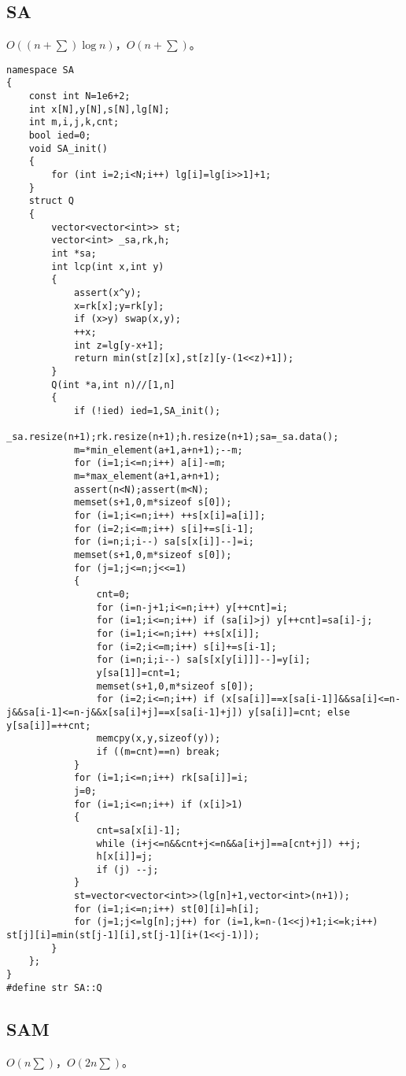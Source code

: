 \documentclass[12pt]{ctexart}
\begin{document}
\subsection{SA}

$O((n+\sum)\log n)$，$O(n+\sum)$。

\begin{lstlisting}
namespace SA
{
	const int N=1e6+2;
	int x[N],y[N],s[N],lg[N];
	int m,i,j,k,cnt;
	bool ied=0;
	void SA_init()
	{
		for (int i=2;i<N;i++) lg[i]=lg[i>>1]+1;
	}
	struct Q
	{
		vector<vector<int>> st;
		vector<int> _sa,rk,h;
		int *sa;
		int lcp(int x,int y)
		{
			assert(x^y);
			x=rk[x];y=rk[y];
			if (x>y) swap(x,y);
			++x;
			int z=lg[y-x+1];
			return min(st[z][x],st[z][y-(1<<z)+1]);
		}
		Q(int *a,int n)//[1,n]
		{
			if (!ied) ied=1,SA_init();
			_sa.resize(n+1);rk.resize(n+1);h.resize(n+1);sa=_sa.data();
			m=*min_element(a+1,a+n+1);--m;
			for (i=1;i<=n;i++) a[i]-=m;
			m=*max_element(a+1,a+n+1);
			assert(n<N);assert(m<N);
			memset(s+1,0,m*sizeof s[0]);
			for (i=1;i<=n;i++) ++s[x[i]=a[i]];
			for (i=2;i<=m;i++) s[i]+=s[i-1];
			for (i=n;i;i--) sa[s[x[i]]--]=i;
			memset(s+1,0,m*sizeof s[0]);
			for (j=1;j<=n;j<<=1)
			{
				cnt=0;
				for (i=n-j+1;i<=n;i++) y[++cnt]=i;
				for (i=1;i<=n;i++) if (sa[i]>j) y[++cnt]=sa[i]-j;
				for (i=1;i<=n;i++) ++s[x[i]];
				for (i=2;i<=m;i++) s[i]+=s[i-1];
				for (i=n;i;i--) sa[s[x[y[i]]]--]=y[i];
				y[sa[1]]=cnt=1;
				memset(s+1,0,m*sizeof s[0]);
				for (i=2;i<=n;i++) if (x[sa[i]]==x[sa[i-1]]&&sa[i]<=n-j&&sa[i-1]<=n-j&&x[sa[i]+j]==x[sa[i-1]+j]) y[sa[i]]=cnt; else y[sa[i]]=++cnt;
				memcpy(x,y,sizeof(y));
				if ((m=cnt)==n) break;
			}
			for (i=1;i<=n;i++) rk[sa[i]]=i;
			j=0;
			for (i=1;i<=n;i++) if (x[i]>1)
			{
				cnt=sa[x[i]-1];
				while (i+j<=n&&cnt+j<=n&&a[i+j]==a[cnt+j]) ++j;
				h[x[i]]=j;
				if (j) --j;
			}
			st=vector<vector<int>>(lg[n]+1,vector<int>(n+1));
			for (i=1;i<=n;i++) st[0][i]=h[i];
			for (j=1;j<=lg[n];j++) for (i=1,k=n-(1<<j)+1;i<=k;i++) st[j][i]=min(st[j-1][i],st[j-1][i+(1<<j-1)]);
		}
	};
}
#define str SA::Q
\end{lstlisting}

\subsection{SAM}

$O(n\sum)$，$O(2n\sum )$。
\end{document}

